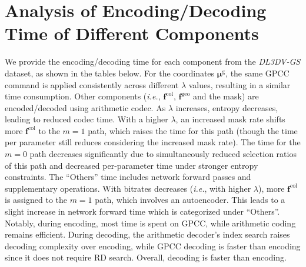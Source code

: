 \documentclass{article} %
\newcommand{\ie}{\textit{i.e.}}
\begin{document}
\section{Analysis of Encoding/Decoding Time of Different Components}
\label{sec:coding_time}
We provide the encoding/decoding time for each component from the \textit{DL3DV-GS} dataset, as shown in the tables below. For the coordinates $\bm{\mu}^\text{g}$, the same GPCC command is applied consistently across different $\lambda$ values, resulting in a similar time consumption. Other components (\ie, $\bm{f}^{\text{col}}$, $\bm{f}^{\text{geo}}$ and the mask) are encoded/decoded using arithmetic codec. As $\lambda$ increases, entropy decreases, leading to reduced codec time. With a higher $\lambda$, an increased mask rate shifts more $\bm{f}^{\text{col}}$ to the $m=1$ path, which raises the time for this path (though the time per parameter still reduces considering the increased mask rate). The time for the $m=0$ path decreases significantly due to simultaneously reduced selection ratios of this path and decreased per-parameter time under stronger entropy constraints. The ``Others'' time includes network forward passes and supplementary operations. With bitrates decreases (\ie, with higher $\lambda$), more $\bm{f}^{\text{col}}$ is assigned to the $m=1$ path, which involves an autoencoder. This leads to a slight increase in network forward time which is categorized under ``Others''. Notably, during encoding, most time is spent on GPCC, while arithmetic coding remains efficient. During decoding, the arithmetic decoder’s index search raises decoding complexity over encoding, while GPCC decoding is faster than encoding since it does not require RD search. Overall, decoding is faster than encoding.
\end{document}
